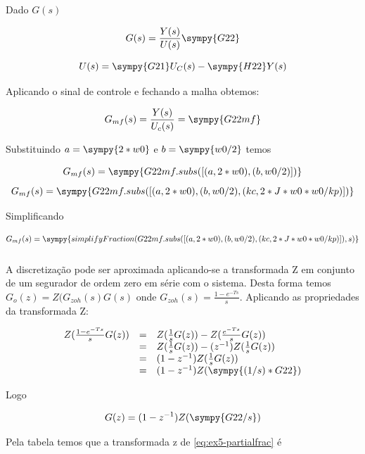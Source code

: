 \documentclass[a4paper,11pt]{article}
\begin{document}
Dado $G(s)$

\begin{equation}
    G(s) = \frac{Y(s)}{U(s)} \sympy{G22}
\end{equation}

\begin{equation}
    U(s) = \sympy{G21}U_C(s) - \sympy{H22}Y(s)
\end{equation}

Aplicando o sinal de controle e fechando a malha obtemos:

$$G_{mf}(s) = \frac{Y(s)}{U_c(s)} = \sympy{G22mf}$$

Substituindo $a = \sympy{2*w0}$ e $b = \sympy{w0/2}$ temos

$$
G_{mf}(s) = \sympy{G22mf.subs([(a,2*w0),(b,w0/2)])}
$$
$$
G_{mf}(s) = \sympy{G22mf.subs([(a,2*w0),(b,w0/2),(kc,2*J*w0*w0/kp)])}
$$

Simplificando

\begin{equation}
    G_{mf}(s) = \sympy{simplifyFraction(G22mf.subs([(a,2*w0),(b,w0/2),(kc,2*J*w0*w0/kp)]),s)}
\end{equation}

\subsubsection{}

A discretização pode ser aproximada aplicando-se a transformada Z em conjunto de um segurador de ordem zero em série com o sistema. Desta forma temos $G_o(z) = Z(G_{zoh}(s)G(s)$ onde $G_{zoh}(s) = \frac{1-e^{-Ts}}{s}$. Aplicando as propriedades da transformada Z:

$$
\begin{array}{lcl}
    Z(\frac{1-e^{-Ts}}{s}G(z)) &=& Z(\frac{1}{s}G(z)) - Z(\frac{e^{-Ts}}{s}G(z))\\
    &=& Z(\frac{1}{s}G(z)) - (z^{-1})Z(\frac{1}{s}G(z))\\
    &=& (1 - z^{-1})Z(\frac{1}{s}G(z))\\
    &=& (1 - z^{-1})Z(\sympy{(1/s)*G22})\\
\end{array}
$$

Logo

\begin{equation}\label{eq:ex5-partialfrac}
 G(z) =   (1 - z^{-1})Z(\sympy{G22/s})
\end{equation}

Pela tabela temos que a transformada z de \ref{eq:ex5-partialfrac} é
\end{document}

